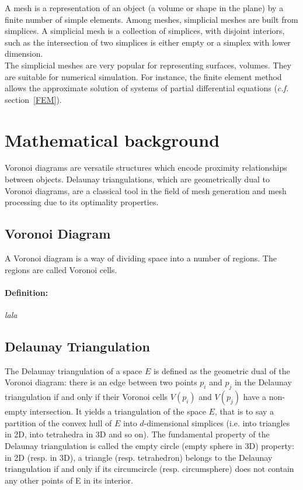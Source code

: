 A mesh is a representation of an object (a volume or shape in the plane) by a finite number of simple elements. Among meshes, simplicial meshes are built from simplices. A simplicial mesh is a collection of simplices, with disjoint interiors, such as the intersection of two simplices is either empty or a simplex with lower dimension. \\
The simplicial meshes are very popular for representing surfaces, volumes. They are suitable for numerical simulation. For instance, the finite element method allows the approximate solution of systems of partial differential equations ({\it c.f.} section~\ref{FEM}).


\section{Mathematical background}

Voronoi diagrams are versatile structures which encode proximity relationships between objects. Delaunay triangulations, which are geometrically dual to Voronoi diagrams, are a classical tool in the field of mesh generation and mesh processing due to its optimality properties.

\subsection{Voronoi Diagram}

A Voronoi diagram is a way of dividing space into a number of regions. The regions are called Voronoi cells.

\paragraph{Definition:}
          {\it 
            lala
          }

\subsection{Delaunay Triangulation}

The Delaunay triangulation of a space $E$ is defined as the geometric dual of the Voronoi diagram: there is an edge between two points $p_{i}$ and $p_{j}$ in the Delaunay triangulation if and only if their Voronoi cells $V(p_{i})$ and $V(p_{j})$ have a non-empty intersection. It yields a triangulation of the space $E$, that is to say a partition of the convex hull of $E$ into $d$-dimensional simplices (i.e. into triangles in 2D, into tetrahedra in 3D and so on). The fundamental property of the Delaunay triangulation is called the empty circle (empty sphere in 3D) property: in 2D (resp. in 3D), a triangle (resp. tetrahedron) belongs to the Delaunay triangulation if and only if its circumcircle (resp. circumsphere) does not contain any other points of E in its interior.


